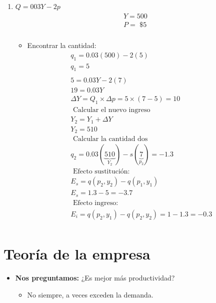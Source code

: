 \begin{enumerate}
    \item $Q=003Y-2p$
        \begin{align*}
            \begin{matrix}
                Y=500 \\ 
                P=\text{  \$  } 5 \\ 
            \end{matrix}
        \end{align*}
        \begin{itemize}
            \item Encontrar la cantidad:
                \begin{align*}
                    q_1 = 0.03(500)-2(5) \\ 
                    q_1 = 5 \\ 
                    \\ 
                    5 = 0.03Y - 2(7) \\ 
                    19 = 0.03Y \\ 
                    \Delta Y = Q_1 \times \Delta p = 5 \times  (7-5) = 10 \\ 
                    \text{  Calcular el nuevo ingreso  } \\ 
                    Y_2 = Y_1 + \Delta Y \\ 
                    Y_2 = 510 \\ 
                    \text{  Calcular la cantidad dos  } \\ 
                    q_2 = 0.03(\underbrace{510}_{Y_2})-s(\underbrace{7}_{p_2}) = -1.3 \\
                    \text{  Efecto sustitución:  } \\ 
                    E_s = q(p_2,y_2)-q(p_1,y_1) \\  
                    E_s = 1.3-5 = -3.7 \\ 
                    \text{  Efecto ingreso:  } \\ 
                    E_i = q(p_2,y_1) - q(p_2,y_2) = 1 -1.3= -0.3 \\ 
                \end{align*}
        \end{itemize}
\end{enumerate}



\section{Teoría de la empresa}
\begin{itemize}
    \item \textbf{Nos preguntamos:} ¿Es mejor más productividad?
        \begin{itemize}
            \item No siempre, a veces exceden la demanda.
        \end{itemize}    
\end{itemize}


